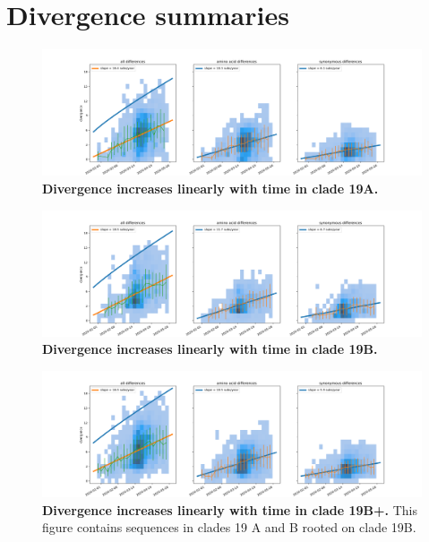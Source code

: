 \section*{Divergence summaries}

\begin{figure}
    \includegraphics[width=\textwidth]{figures/rtt/19A_rtt.png}
    \caption{{\bf Divergence increases linearly with time in clade 19A.}
    \label{fig:19A_divergence}}
\end{figure}

\begin{figure}
    \includegraphics[width=\textwidth]{figures/rtt/19B_rtt.png}
    \caption{{\bf Divergence increases linearly with time in clade 19B.}
    \label{fig:19B_divergence}}
\end{figure}

\begin{figure}
    \includegraphics[width=\textwidth]{figures/rtt/19B+_rtt.png}
    \caption{{\bf Divergence increases linearly with time in clade 19B+.}
    This figure contains sequences in clades 19 A and B rooted on clade 19B.
    \label{fig:19B+_divergence}}
\end{figure}

